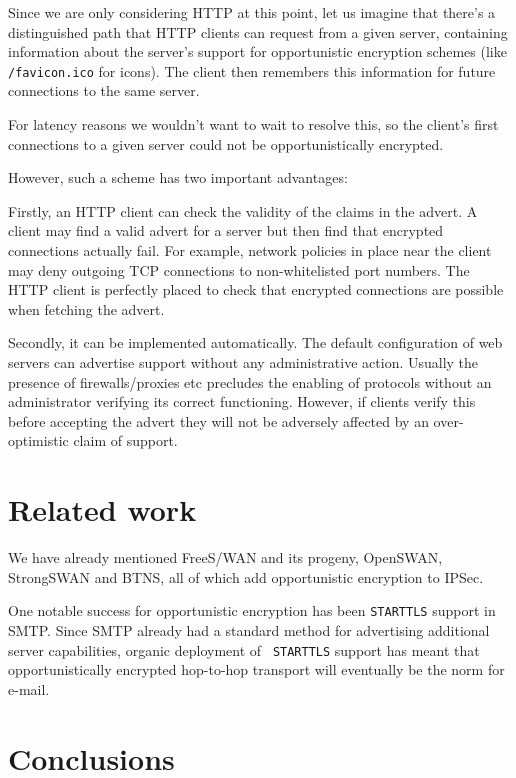 \documentclass[conference]{IEEEtran}
\begin{document}
Since we are only considering HTTP at this point, let us imagine that there's a
distinguished path that HTTP clients can request from a given server,
containing information about the server's support for opportunistic encryption
schemes (like {\tt /favicon.ico} for icons). The client then remembers this
information for future connections to the same server.

For latency reasons we wouldn't
want to wait to resolve this, so the client's first connections to a given server
could not be opportunistically encrypted.

However, such a scheme has two important advantages:

Firstly, an HTTP client can check the validity of the claims in the advert. A
client may find a valid advert for a server but then find that encrypted
connections actually fail. For example, network policies in place near the
client may deny outgoing TCP connections to non-whitelisted port numbers. The
HTTP client is perfectly placed to check that encrypted connections are
possible when fetching the advert.

Secondly, it can be implemented automatically. The default configuration of web
servers can advertise support without any administrative action. Usually the
presence of firewalls/proxies etc precludes the enabling of protocols without an
administrator verifying its correct functioning. However, if clients verify
this before accepting the advert they will not be adversely affected by an
over-optimistic claim of support.

\section{Related work}

We have already mentioned FreeS/WAN\cite{freeswan} and its progeny, OpenSWAN,
StrongSWAN and BTNS\cite{btns}, all of which add opportunistic encryption to
IPSec.

One notable success for opportunistic encryption has been {\tt STARTTLS}
support in SMTP\cite{rfc3207}. Since SMTP already had a standard method for
advertising additional server capabilities, organic deployment of {\tt
STARTTLS} support has meant that opportunistically encrypted hop-to-hop
transport will eventually be the norm for e-mail.

\section{Conclusions}
\end{document}

